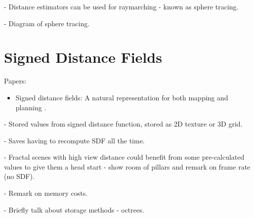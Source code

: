 - Distance estimators can be used for raymarching - known as sphere tracing.

- Diagram of sphere tracing.

\section{Signed Distance Fields}

Papers:
\begin{itemize}
	\item Signed distance fields: A natural representation for both mapping and planning \cite{oleynikova2016signed}.
\end{itemize}

- Stored values from signed distance function, stored as 2D texture or 3D grid.

- Saves having to recompute SDF all the time.

- Fractal scenes with high view distance could benefit from some pre-calculated values to give them a head start - show room of pillars and remark on frame rate (no SDF).

- Remark on memory costs.

- Briefly talk about storage methods - octrees.